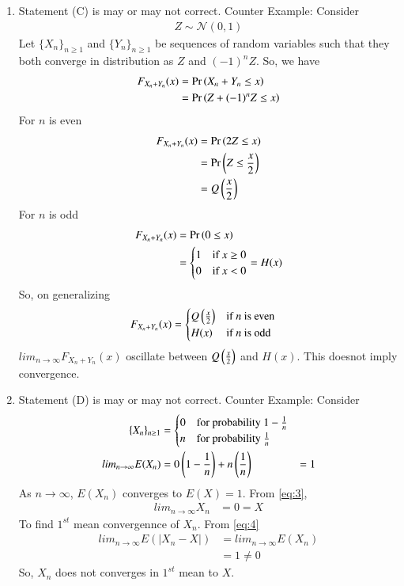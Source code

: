 \documentclass[journal,12pt,twocolumn]{IEEEtran}
\theoremstyle{remark}
\begin{document}
\begin{enumerate}[label=(\Alph*)]
\item Statement (C) is may or may not correct.
Counter Example: Consider
\begin{align}
Z \sim \mathcal{N}(0,1)
\end{align}
Let $\{X_n\}_{n \geq 1}$ and $\{Y_n\}_{n \geq 1}$ be sequences of random variables such that they both converge in distribution as $Z$ and $(-1)^nZ$. So, we have
\begin{align}
F_{X_n+Y_n}(x) &= \Pr\left(X_n+Y_n \leq x\right)\\
&=\Pr\left(Z+(-1)^nZ \leq x\right)
\end{align}
For $n$ is even
\begin{align}
F_{X_n+Y_n}(x) &= \Pr\left(2Z \leq x\right)\\
&=\Pr\left(Z \leq \frac{x}{2}\right)\\
&=Q\left(\frac{x}{2}\right)
\end{align}
For $n$ is odd
\begin{align}
F_{X_n+Y_n}(x) &= \Pr\left(0 \leq x\right)\\
&=\begin{cases}
            1 & \text{if } x \geq 0\\
            0 & \text{if } x<0
        \end{cases}
        =H(x)
\end{align}
So, on generalizing
\begin{align}
F_{X_n+Y_n}(x)
&=\begin{cases}
            Q\left(\frac{x}{2}\right) & \text{if } n \text{ is even}\\
            H(x) & \text{if } n \text{ is odd}
        \end{cases}
\end{align}
$lim_{n \to \infty} F_{X_n+Y_n}(x)$ oscillate between $Q\left(\frac{x}{2}\right)$ and $H(x)$. This doesnot imply convergence.
\item Statement (D) is may or may not correct.
Counter Example:
Consider 
\begin{align}
\{X_n\}_{n \geq 1}&= \begin{cases}
            0 & \text{for probability } 1-\frac{1}{n}\\
            n & \text{for probability } \frac{1}{n}
        \end{cases}
        \label{eq:3}\\
lim_{n \to \infty} E(X_n)&=0\left(1-\frac{1}{n}\right)+n\left(\frac{1}{n}\right)
&=1\label{eq:4}
\end{align}
As $n \to \infty$, $E(X_n)$ converges to $E(X)=1$. From \eqref{eq:3},
\begin{align}
lim_{n \to \infty} X_n&=0=X
\end{align}
To find $1^{st}$ mean convergennce of $X_n$. From \eqref{eq:4}
\begin{align}
lim_{n \to \infty} E(|X_n-X|)&=lim_{n \to \infty} E(X_n)\\
&=1 \ne 0
\end{align}
So, $X_n$ does not converges in $1^{st}$ mean to $X$.
\end{enumerate}
\end{document}
